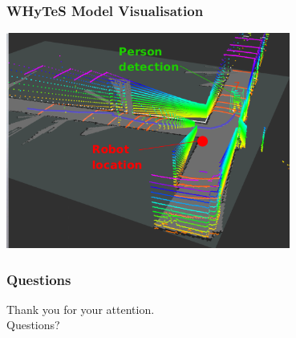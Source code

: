 
\begin{frame}
	\frametitle{WHyTeS Model Visualisation}
    \vspace{3mm}
    \href{run:./video/WHyTeS_visualisation.mp4}{\includegraphics[width=0.7\textwidth]{fig/corridor_datasetb.png}}
\end{frame}



\begin{frame}
	\frametitle{Questions}
	\begin{center}
		\vfill
		Thank you for your attention.\\
		\vfill
		Questions?
		\vfill
	\end{center}
\end{frame}



